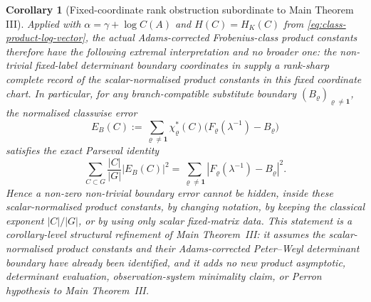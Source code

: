 \documentclass[11pt,a4paper]{amsart}
\theoremstyle{plain}
\newtheorem{corollary}[theorem]{Corollary}
\theoremstyle{definition}
\theoremstyle{remark}
\begin{document}
\begin{corollary}[Fixed-coordinate rank obstruction subordinate to Main Theorem III]
  Applied with \(\alpha=\gamma+\log C(A)\) and
  \(H(C)=H_K(C)\) from \eqref{eq:class-product-log-vector}, the actual
  Adams-corrected Frobenius-class product constants therefore have the
  following extremal interpretation and no broader one: the non-trivial
  fixed-label determinant boundary coordinates in
   supply a rank-sharp complete
  record of the scalar-normalised product constants in this fixed coordinate
  chart.  In particular, for
  any branch-compatible substitute boundary
  \((B_\varrho)_{\varrho\ne\mathbf1}\), the normalised classwise error
  \[
    E_B(C):=
    \sum_{\varrho\ne\mathbf1}\chi_\varrho^\ast(C)
      \bigl(F_\varrho(\lambda^{-1})-B_\varrho\bigr)
  \]
  satisfies the exact Parseval identity
  \begin{equation}\label{eq:minimal-skeleton-error-bound}
    \sum_{C\subset G}\frac{|C|}{|G|}|E_B(C)|^2
    =
    \sum_{\varrho\ne\mathbf1}
      |F_\varrho(\lambda^{-1})-B_\varrho|^2.
  \end{equation}
  Hence a non-zero non-trivial boundary error cannot be hidden, inside these
  scalar-normalised product constants, by changing notation, by keeping the
  classical exponent \(|C|/|G|\), or by using only scalar fixed-matrix data.
  This statement is a corollary-level structural refinement of Main
  Theorem~III: it assumes the scalar-normalised product constants and their
  Adams-corrected Peter--Weyl determinant boundary have already been
  identified, and it adds no new product asymptotic, determinant evaluation,
  observation-system minimality claim, or Perron hypothesis to Main
  Theorem~III.
\end{corollary}
\end{document}
